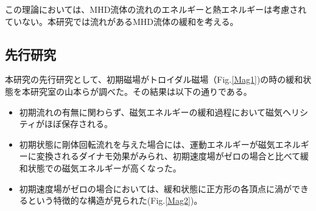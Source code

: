 \documentclass[12pt]{jsarticle}
\begin{document}
この理論においては、MHD流体の流れのエネルギーと熱エネルギーは考慮されていない。本研究では流れがあるMHD流体の緩和を考える。





\subsection{先行研究}
本研究の先行研究として、初期磁場がトロイダル磁場（Fig.\ref{Mag1})の時の緩和状態を本研究室の山本らが調べた。その結果は以下の通りである。
\begin{itemize}
\item 初期流れの有無に関わらず、磁気エネルギーの緩和過程において磁気ヘリシティがほぼ保存される。
\item 初期状態に剛体回転流れを与えた場合には、運動エネルギーが磁気エネルギーに変換されるダイナモ効果がみられ、初期速度場がゼロの場合と比べて緩和状態での磁気エネルギーが高くなった。
\item 初期速度場がゼロの場合においては、緩和状態に正方形の各頂点に渦ができるという特徴的な構造が見られた(Fig.\ref{Mag2})。
\end{itemize}
\end{document}
